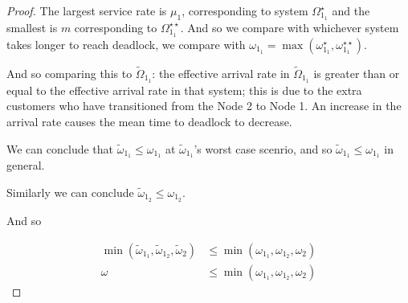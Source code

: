 \documentclass{article}
\begin{document}
\begin{proof}
The largest service rate is $\mu_1$, corresponding to system $\Omega_{1_1}^{\star}$ and the smallest is $m$ corresponding to $\Omega_{1_1}^{\star\star}$.
And so we compare with whichever system takes longer to reach deadlock, we compare with $\omega_{1_1} = \max(\omega_{1_1}^{\star}, \omega_{1_1}^{\star\star})$.

And so comparing this to $\widetilde{\Omega}_{1_1}$: the effective arrival rate in $\widetilde{\Omega}_{1_1}$ is greater than or equal to the effective arrival rate in that system; this is due to the extra customers who have transitioned from the Node 2 to Node 1. An increase in the arrival rate causes the mean time to deadlock to decrease.

We can conclude that $\widetilde{\omega}_{1_1} \leq \omega_{1_1}$ at $\widetilde{\omega}_{1_1}$'s worst case scenrio, and so $\widetilde{\omega}_{1_1} \leq \omega_{1_1}$ in general.

Similarly we can conclude $\widetilde{\omega}_{1_2} \leq \omega_{1_2}$.

And so

\begin{align*}
\min(\widetilde{\omega}_{1_1}, \widetilde{\omega}_{1_2}, \widetilde{\omega}_2) &\leq \min(\omega_{1_1}, \omega_{1_2}, \omega_2) \\
\omega &\leq \min(\omega_{1_1}, \omega_{1_2}, \omega_2)
\end{align*}

\end{proof}



\end{document}
